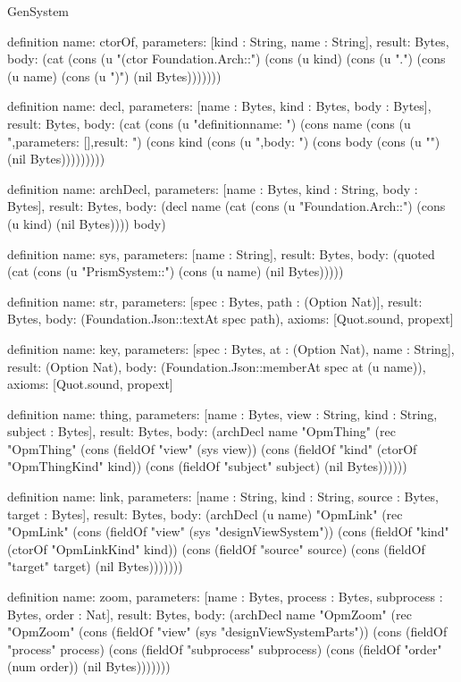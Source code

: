 \begin{lexlean}{GenSystem}
\begin{semanticmodule}
{definition{
  name: ctorOf,
  parameters: [kind : String, name : String],
  result: Bytes,
  body: (cat (cons (u "(ctor Foundation.Arch::") (cons (u kind) (cons (u ".") (cons (u name) (cons (u ")") (nil Bytes)))))))
}

definition{
  name: decl,
  parameters: [name : Bytes, kind : Bytes, body : Bytes],
  result: Bytes,
  body: (cat (cons (u "definition{\n  name: ") (cons name (cons (u ",\n  parameters: [],\n  result: ") (cons kind (cons (u ",\n  body: ") (cons body (cons (u "\n}\n") (nil Bytes)))))))))
}

definition{
  name: archDecl,
  parameters: [name : Bytes, kind : String, body : Bytes],
  result: Bytes,
  body: (decl name (cat (cons (u "Foundation.Arch::") (cons (u kind) (nil Bytes)))) body)
}

definition{
  name: sys,
  parameters: [name : String],
  result: Bytes,
  body: (quoted (cat (cons (u "PrismSystem::") (cons (u name) (nil Bytes)))))
}

definition{
  name: str,
  parameters: [spec : Bytes, path : (Option Nat)],
  result: Bytes,
  body: (Foundation.Json::textAt spec path),
  axioms: [Quot.sound, propext]
}

definition{
  name: key,
  parameters: [spec : Bytes, at : (Option Nat), name : String],
  result: (Option Nat),
  body: (Foundation.Json::memberAt spec at (u name)),
  axioms: [Quot.sound, propext]
}

definition{
  name: thing,
  parameters: [name : Bytes, view : String, kind : String, subject : Bytes],
  result: Bytes,
  body: (archDecl name "OpmThing" (rec "OpmThing" (cons (fieldOf "view" (sys view)) (cons (fieldOf "kind" (ctorOf "OpmThingKind" kind)) (cons (fieldOf "subject" subject) (nil Bytes))))))
}

definition{
  name: link,
  parameters: [name : String, kind : String, source : Bytes, target : Bytes],
  result: Bytes,
  body: (archDecl (u name) "OpmLink" (rec "OpmLink" (cons (fieldOf "view" (sys "designViewSystem")) (cons (fieldOf "kind" (ctorOf "OpmLinkKind" kind)) (cons (fieldOf "source" source) (cons (fieldOf "target" target) (nil Bytes)))))))
}

definition{
  name: zoom,
  parameters: [name : Bytes, process : Bytes, subprocess : Bytes, order : Nat],
  result: Bytes,
  body: (archDecl name "OpmZoom" (rec "OpmZoom" (cons (fieldOf "view" (sys "designViewSystemParts")) (cons (fieldOf "process" process) (cons (fieldOf "subprocess" subprocess) (cons (fieldOf "order" (num order)) (nil Bytes)))))))
}

}
\end{semanticmodule}
\end{lexlean}
